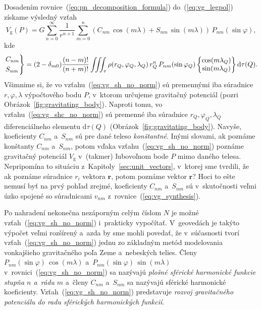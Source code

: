 \documentclass[a4paper, 12pt]{book}
\newcommand{\diff}{\mathrm d}
\newcommand{\gidx}{\mathrm g}
\let\vec\mathbf
\begin{document}
Dosadením rovnice~(\ref{eq:pn_decomposition_formula}) do~(\ref{eq:vg_legpol})
získame výsledný vzťah
%
\begin{equation}
\label{eq:vg_sh_no_norm}
V_\gidx(P) = G \sum_{n = 0}^\infty \frac{1}{r^{n + 1}} \sum_{m = 0}^{n} \left(
C_{nm} \, \cos(m\lambda) + S_{nm} \, \sin(m\lambda)\right) \,
P_{nm}(\sin\varphi){,}
\end{equation}
%
kde
%
\begin{equation}
\label{eq:vg_shc_no_norm}
\begin{rcases}
C_{nm}\\
S_{nm}
\end{rcases}
= (2 - \delta_{m0}) \frac{(n - m)!}{(n + m)!} \iiint_{\tau} \rho(r_Q,
\varphi_Q, \lambda_Q) \, r_Q^n \, P_{nm}(\sin\varphi_Q)
%
\begin{Bmatrix}
\cos(m\lambda_Q)\\
\sin(m\lambda_Q)
\end{Bmatrix}
%
\diff\tau(Q){.}
\end{equation}
%
Všimnime si, že vo vzťahu~(\ref{eq:vg_sh_no_norm}) sú premennými iba súradnice
$r, \varphi, \lambda$ výpočtového bodu $P$, v~ktorom určujeme gravitačný
potenciál (pozri Obrázok~\ref{fig:gravitating_body}).  Naproti tomu, vo
vzťahu~(\ref{eq:vg_shc_no_norm}) sú premenné iba súradnice $r_Q,\varphi_Q,
\lambda_Q$ diferenciálneho elementu $\diff\tau(Q)$
(Obrázok~\ref{fig:gravitating_body}).  Navyše, koeficienty $C_{nm}$ a~$S_{nm}$
sú pre dané teleso \emph{konštantné}.  Inými slovami, ak poznáme konštanty
$C_{nm}$ a~$S_{nm}$, potom vďaka vzťahu~(\ref{eq:vg_sh_no_norm}) poznáme
gravitačný potenciál $V_\gidx$ v~(takmer) ľubovoľnom bode $P$ mimo daného
telesa.  Nepripomína to situáciu z~Kapitoly~\ref{sec:unit_vectors}, v~ktorej
sme tvrdili, že ak poznáme súradnice $r_i$ vektora $\vec r$, potom poznáme
vektor $\vec r$?  Hoci to ešte nemusí byť na prvý pohľad zrejmé, koeficienty
$C_{nm}$ a~$S_{nm}$ sú v~skutočnosti veľmi úzko spojené so súradnicami $v_{nm}$
z~rovnice~(\ref{eq:vg_synthesis}).

Po nahradení nekonečna nezáporným celým číslom $N$ je možné
vzťah~(\ref{eq:vg_sh_no_norm}) i~prakticky vypočítať.  V~geovedách je takýto
výpočet veľmi rozšírený a~azda by sme mohli povedať, že v~súčasnosti tvorí
vzťah~(\ref{eq:vg_sh_no_norm}) jednu zo základným metód modelovania vonkajšieho
gravitačného poľa Zeme a~nebeských telies.  Členy $P_{nm}(\sin\varphi) \,
\cos(m\lambda)$ a~$ P_{nm}(\sin\varphi) \, \sin(m\lambda)$
v~rovnici~(\ref{eq:vg_sh_no_norm}) sa nazývajú \emph{plošné sférické harmonické
funkcie stupňa $n$ a~rádu $m$} a~členy $C_{nm}$ a~$S_{nm}$ sa nazývajú sférické
harmonické koeficienty.  Vzťah~(\ref{eq:vg_sh_no_norm}) predstavuje
\emph{rozvoj gravitačného potenciálu do radu sférických harmonických funkcií}.
\end{document}
